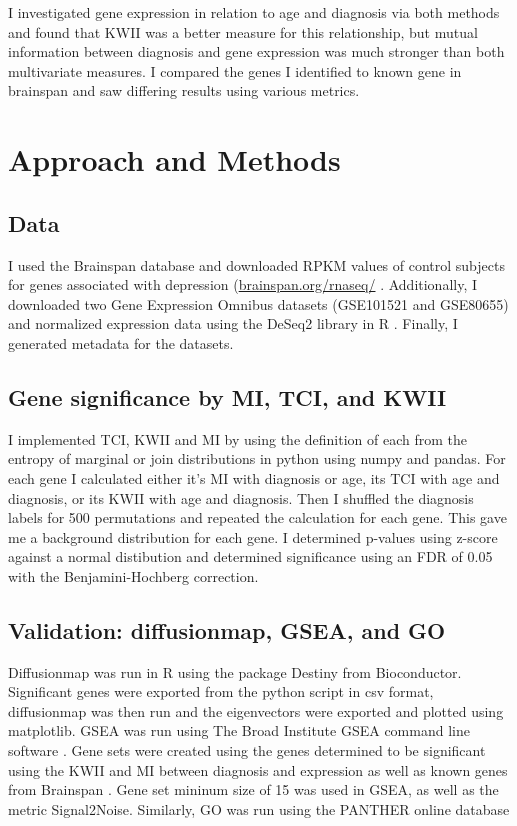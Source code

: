 \documentclass{bioinfo}
\begin{document}
I investigated gene expression in relation to age and diagnosis via both methods and found that KWII was a better measure for this relationship, but mutual information between diagnosis and gene expression was much stronger than both multivariate measures.  I compared the genes I identified to known gene in brainspan and saw differing results using various metrics.

\section{Approach and Methods}

\subsection{Data}
I used the Brainspan database and downloaded RPKM values of control subjects for genes associated with depression (\href{http://www.brainspan.org/rnaseq/}{brainspan.org/rnaseq/} \citep{Brainspan}.  Additionally, I downloaded two Gene Expression Omnibus datasets (GSE101521 and GSE80655) and normalized
expression data using the DeSeq2 library in R \citep{Love}.  Finally, I generated metadata for the datasets.

\subsection{Gene significance by MI, TCI, and KWII}
I implemented TCI, KWII and MI by using the definition of each from the entropy of marginal or join distributions in python using numpy and pandas.  For each gene I calculated either it's MI with diagnosis or age, its TCI with age and diagnosis, or its KWII with age and diagnosis.  Then I shuffled the diagnosis labels for 500 permutations and repeated the calculation for each gene.  This gave me a background distribution for each gene.  I determined p-values using z-score against a normal
distibution and determined significance using an FDR of 0.05 with the Benjamini-Hochberg correction.

\subsection{Validation: diffusionmap, GSEA, and GO}
Diffusionmap was run in R using the package Destiny from Bioconductor.  Significant genes were exported from the python script in csv format, diffusionmap was then run and the eigenvectors were exported and plotted using matplotlib.  GSEA was run using The Broad Institute GSEA command line software \citep{Subramanian}.  Gene sets were created using the genes determined to be significant using the KWII and MI between diagnosis and expression as well as known genes from Brainspan
\citep{Brainspan}.  Gene set mininum size of 15 was used in GSEA, as well as the metric Signal2Noise.    Similarly, GO was run using the PANTHER online database \citep{GO}
\end{document}
